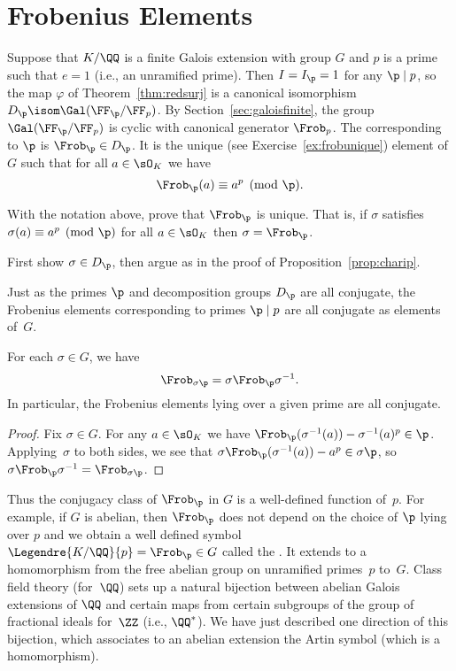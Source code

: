 \section{Frobenius Elements}

Suppose that $K/\QQ$ is a finite Galois extension with group $G$ and $p$ is a
prime such that $e = 1$ (i.e., an unramified prime). Then $I = I_\p = 1$ for
any $\p\mid p$, so the map $\varphi$ of Theorem~\ref{thm:redsurj} is a canonical
isomorphism $D_\p \isom \Gal(\FF_{\p}/\FF_p)$. By Section~\ref{sec:galoisfinite},
the group $\Gal(\FF_{\p}/\FF_p)$ is cyclic with canonical generator $\Frob_p$.
The  corresponding to $\p$ is $\Frob_\p \in D_\p$.
It is the unique (see Exercise~\ref{ex:frobunique}) element of $G$ such that
for all $a \in \sO_K$ we have
\[
  \Frob_\p(a) \equiv a^p\pmod{\p}.
\]

\begin{exercise}\label{ex:frobunique}
  With the notation above, prove that $\Frob_\p$ is unique.
  That is, if $\sigma$ satisfies $\sigma(a) \equiv a^p \pmod{\p}$
  for all $a\in\sO_K$ then $\sigma = \Frob_\p$.
  
  \begin{hint}
    First show $\sigma\in D_\p$, then argue as in
    the proof of Proposition~\ref{prop:charip}.
  \end{hint}
\end{exercise}


Just as the primes $\p$ and decomposition groups $D_\p$ are all
conjugate, the Frobenius elements corresponding to primes
$\p\mid p$ are all conjugate as elements of~$G$.

\begin{proposition}
  For each $\sigma \in G$, we have
  \[
    \Frob_{\sigma\p} = \sigma\Frob_\p\sigma^{-1}.
  \]
  In particular, the Frobenius elements lying over a given
  prime are all conjugate.
\end{proposition}
\begin{proof}
  Fix $\sigma\in G$. For any $a\in\sO_K$ we have
  $\Frob_\p(\sigma^{-1}(a)) - \sigma^{-1}(a)^p \in \p$.
  Applying~$\sigma$ to both sides, we see that
  $\sigma\Frob_\p(\sigma^{-1}(a)) - a^p \in \sigma\p$,
  so $\sigma\Frob_\p\sigma^{-1} = \Frob_{\sigma \p}$.
\end{proof}

Thus the conjugacy class of $\Frob_\p$ in $G$ is a well-defined
function of~$p$.  For example, if $G$ is abelian, then $\Frob_\p$ does
not depend on the choice of $\p$ lying over $p$ and we obtain a well
defined symbol $\Legendre{K/\QQ}{p} = \Frob_\p\in G$ called the .
It extends to a homomorphism from the free abelian
group on unramified primes~$p$ to~$G$.
Class field theory (for~$\QQ$) sets up a natural bijection
between abelian Galois extensions of $\QQ$ and certain maps from
certain subgroups of the group of fractional ideals for~$\ZZ$ (i.e., $\QQ^*$).
We have just described one direction of this bijection, which associates to an
abelian extension the Artin symbol (which is a homomorphism).

